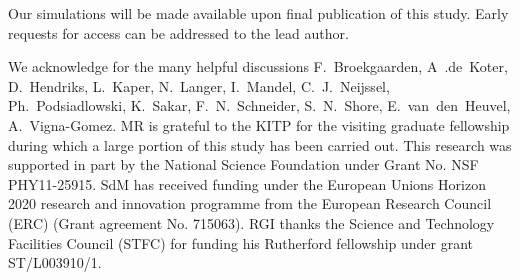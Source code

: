 \documentclass{aa}
\begin{document}
Our simulations will be made available upon final publication of this study.  Early requests for access can be addressed to the lead author. 

\begin{acknowledgements}
  We acknowledge for the many helpful discussions
  F.~Broekgaarden, A~.de~Koter, D.~Hendriks, L.~Kaper, N.~Langer, I.~Mandel, C.~J.~Neijssel, Ph.~Podsiadlowski,
  K.~Sakar, F.~N.~Schneider, S.~N.~Shore, E.~van~den~Heuvel, A.~Vigna-Gomez.
  MR is grateful to the KITP for the visiting graduate fellowship during which a large portion of this
  study has been carried out. This research was supported in part by
  the National Science Foundation under Grant No. NSF PHY11-25915. SdM has received funding under the European Unions Horizon 2020 research and innovation programme from the European Research
Council (ERC) (Grant agreement No. 715063).
  RGI thanks the Science and Technology Facilities Council (STFC) for funding his Rutherford fellowship under grant ST/L003910/1.

\end{acknowledgements}
\end{document}
